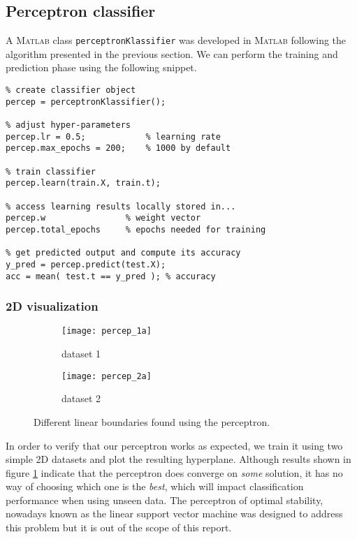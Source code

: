 \subsection{Perceptron classifier}

A \textsc{Matlab} class \texttt{perceptronKlassifier} was developed in \textsc{Matlab} following the algorithm presented in the previous section. We can perform the training and prediction phase using the following snippet.
\begin{lstlisting}
% create classifier object
percep = perceptronKlassifier();

% adjust hyper-parameters
percep.lr = 0.5;            % learning rate
percep.max_epochs = 200;    % 1000 by default

% train classifier
percep.learn(train.X, train.t);

% access learning results locally stored in... 
percep.w                % weight vector
percep.total_epochs     % epochs needed for training

% get predicted output and compute its accuracy
y_pred = percep.predict(test.X);
acc = mean( test.t == y_pred );	% accuracy
\end{lstlisting}

\subsubsection{2D visualization}
\begin{figure}[]
	\centering
	\begin{subfigure}[]{0.25\textwidth}
		\texttt{[image: percep\_1a]}
		\caption{dataset 1}
	\end{subfigure}%
	\begin{subfigure}[]{0.25\textwidth}
		\texttt{[image: percep\_2a]}
		\caption{dataset 2}
	\end{subfigure}
	\caption{Different linear boundaries found using the perceptron.}
	\label{fig:percep_tests}
\end{figure}

In order to verify that our perceptron works as expected, we train it using two simple 2D datasets and plot the resulting hyperplane. Although results shown in figure \ref{fig:percep_tests} indicate that the perceptron does converge on \textit{some} solution, it has no way of choosing which one is the \textit{best}, which will impact  classification performance when using unseen data. The perceptron of optimal stability, nowadays known as the linear support vector machine was designed to address this problem but it is out of the scope of this report.\\

